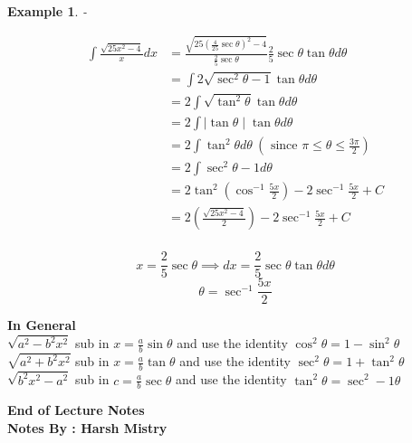 \documentclass{article}
\newtheorem{ex}[theorem]{Example}
\begin{document}
\begin{ex} - \\
\begin{minipage}{.5\textwidth} %
$$
\begin{aligned}
\int \frac{\sqrt{25x^2-4}}{x} dx & = \frac{\sqrt{25(\frac{4}{25} \sec \theta )^2-4}}{\frac{2}{5} \sec \theta} \frac{2}{5} \sec \theta \tan \theta d\theta \\
& = \int 2 \sqrt{\sec ^2 \theta -1} \tan \theta d\theta \\
& = 2 \int  \sqrt{\tan ^2 \theta} \tan \theta d\theta \\
& = 2 \int  \mid \tan \theta \mid  \tan \theta d\theta \\
& = 2 \int  \tan ^2 \theta d\theta  \ (\text{ since } \pi \leq \theta \leq \frac{3\pi}{2} )\\
& = 2 \int  \sec ^2 \theta - 1 d\theta \\
& = 2 \tan ^2 (\cos ^{-1} \frac{5x}{2}) - 2 \sec ^ {-1} \frac{5x}{2} + C\\
& = 2 (\frac{\sqrt{25x^2-4}}{2}) - 2 \sec ^ {-1} \frac{5x}{2} + C\\
\end{aligned}
$$
\end{minipage} %
\begin{minipage}{.5\textwidth} %
$$ x = \frac{2}{5}\sec\theta \implies dx = \frac{2}{5}\sec \theta \tan \theta d \theta $$
$$ \theta = \sec ^{-1} \frac{5x}{2} $$
\end{minipage}
\end{ex}

\textbf{In General } \\
\(\sqrt{a^2 - b^2 x^2}\)  sub in \(x = \frac{a}{b} \sin \theta \)  and use the identity \(\cos ^2 \theta = 1  - \sin ^2 \theta  \) \\
\(\sqrt{a^2 + b^2 x^2}\)  sub in \(x = \frac{a}{b} \tan \theta \)  and use the identity \(\sec ^2 \theta = 1  + \tan ^2 \theta  \) \\
\(\sqrt{b^2 x^2 - a^2}\)  sub in \(c = \frac{a}{b} \sec \theta \)  and use the identity \(\tan ^2 \theta = \sec ^2 -1  \theta  \)


\begin{center}
\textbf{End of Lecture Notes} \\
\textbf{Notes By : Harsh Mistry}
\end{center}
\end{document}
